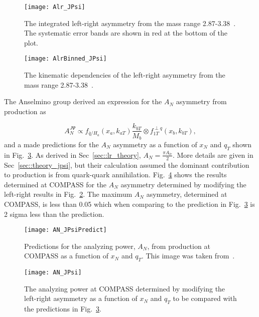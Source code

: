 \begin{figure}[h!t]
  \centering
  \texttt{[image: Alr\_JPsi]}
  \caption{The integrated left-right asymmetry from the mass range
    2.87-3.38~{\gvcw}.  The systematic error bands are shown in red at the
    bottom of the plot.}
  \label{fig::Alr_JPsi}
\end{figure}

\begin{figure}[h!t]
  \centering \texttt{[image: AlrBinned\_JPsi]}
  \caption{The kinematic dependencies of the left-right asymmetry from the mass
    range 2.87-3.38~{\gvcw}.}
  \label{fig::AlrBinned_JPsi}
\end{figure}

The Anselmino group derived an expression for the $A_N$ asymmetry from {\jp}
production as~\cite{Anselmino:2016fhz}

\begin{equation}
  A^{J\Psi}_{N} \propto f_{\bar{q}/H_a}(x_a, k_{aT})
  \frac{k_{bT}}{M_b} \otimes f_{1T}^{\perp q}(x_b, k_{bT}),
\end{equation}
\noindent
and a made predictions for the $A_N$ asymmetry as a function of $x_N$ and $q_T$
shown in Fig.~\ref{fig::AN_JPsiPredict}.  As derived in
Sec~\ref{sec::lr_theory}, $A_{N} = \frac{\pi A_{lr}}{2}$.  More details are
given in Sec~\ref{sec::theory_jpsi}, but their calculation assumed the dominant
contribution to {\jp} production is from quark-quark annihilation.
Fig.~\ref{fig::AN_JPsi} shows the results determined at COMPASS for the $A_N$
asymmetry determined by modifying the left-right results in
Fig.~\ref{fig::AlrBinned_JPsi}.  The maximum $A_N$ asymmetry, determined at
COMPASS, is less than 0.05 which when comparing to the prediction in
Fig.~\ref{fig::AN_JPsiPredict} is 2 sigma less than the prediction.

\begin{figure}[h!t]
  \centering \texttt{[image: AN\_JPsiPredict]}
  \caption{Predictions for the analyzing power, $A_N$, from {\jp} production at
    COMPASS as a function of $x_N$ and $q_T$.  This image was taken
    from~\cite{Anselmino:2016fhz}.}
  \label{fig::AN_JPsiPredict}
\end{figure}

\begin{figure}[h!t]
  \centering \texttt{[image: AN\_JPsi]}
  \caption{The analyzing power at COMPASS determined by modifying the left-right
    asymmetry as a function of $x_N$ and $q_T$ to be compared with the
    predictions in Fig.~\ref{fig::AN_JPsiPredict}. }
  \label{fig::AN_JPsi}
\end{figure}

